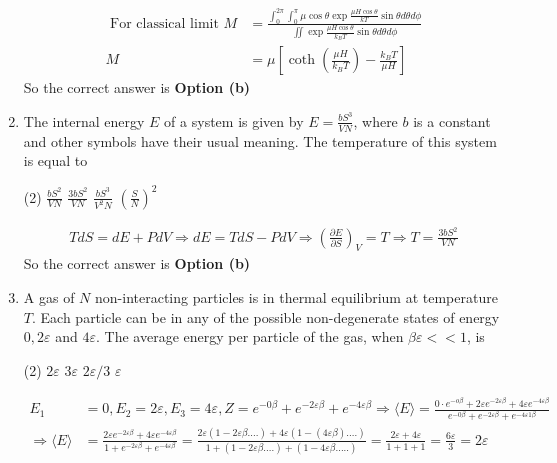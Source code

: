 \begin{enumerate}
\begin{answer}
\begin{align*}
	\text { For classical limit } M&=\frac{\int_{0}^{2 \pi} \int_{0}^{\pi} \mu \cos \theta \exp \frac{\mu H \cos \theta}{k T} \sin \theta d \theta d \phi}{\iint \exp \frac{\mu H \cos \theta}{k_{B} T} \sin \theta d \theta d \phi} \\
	M&=\mu\left[\operatorname{coth}\left(\frac{\mu H}{k_{B} T}\right)-\frac{k_{B} T}{\mu H}\right]
	\end{align*}
		So the correct answer is \textbf{Option (b)}
\end{answer}
\item 	The internal energy $E$ of a system is given by $E=\frac{b S^{3}}{V N}$, where $b$ is a constant and other symbols have their usual meaning. The temperature of this system is equal to
{	}
	 \begin{tasks}(2)
		\task[\textbf{a.}]$\frac{b S^{2}}{V N}$
		\task[\textbf{b.}]$\frac{3 b S^{2}}{V N}$
		\task[\textbf{c.}]$\frac{b S^{3}}{V^{2} N}$
		\task[\textbf{d.}] $\left(\frac{S}{N}\right)^{2}$
	\end{tasks}
\begin{answer}
	\begin{align*}
	T d S=d E+P d V \Rightarrow d E=T d S-P d V \Rightarrow\left(\frac{\partial E}{\partial S}\right)_{V}=T \Rightarrow T=\frac{3 b S^{2}}{V N}
	\end{align*}
	So the correct answer is \textbf{Option (b)}
\end{answer}
\item A gas of $N$ non-interacting particles is in thermal equilibrium at temperature $T$. Each particle can be in any of the possible non-degenerate states of energy $0,2 \varepsilon$ and $4 \varepsilon$. The average energy per particle of the gas, when $\beta \varepsilon<<1$, is
{	}
 \begin{tasks}(2)
	\task[\textbf{a.}]$2 \varepsilon$
	\task[\textbf{b.}] $3 \varepsilon$
	\task[\textbf{c.}]$2 \varepsilon / 3$
	\task[\textbf{d.}]  $\varepsilon$
\end{tasks}	
\begin{answer}
	\begin{align*}
	E_{1}&=0, E_{2}=2 \varepsilon, E_{3}=4 \varepsilon, Z=e^{-0 \beta}+e^{-2 \varepsilon \beta}+e^{-4 \varepsilon \beta} \Rightarrow\langle E\rangle=\frac{0 \cdot e^{-o \beta}+2 \varepsilon e^{-2 \varepsilon \beta}+4 \varepsilon e^{-4 \varepsilon \beta}}{e^{-0 \beta}+e^{-2 \varepsilon \beta}+e^{-4 \varepsilon 1 \beta}} \\
	\Rightarrow\langle E\rangle&=\frac{2 \varepsilon e^{-2 \varepsilon \beta}+4 \varepsilon e^{-4 \varepsilon \beta}}{1+e^{-2 \varepsilon \beta}+e^{-4 \varepsilon \beta}}=\frac{2 \varepsilon(1-2 \varepsilon \beta \ldots .)+4 \varepsilon(1-(4 \varepsilon \beta) \ldots .)}{1+(1-2 \varepsilon \beta \ldots .)+(1-4 \varepsilon \beta \ldots . .)}=\frac{2 \varepsilon+4 \varepsilon}{1+1+1}=\frac{6 \varepsilon}{3}=2 \varepsilon\\

\end{align*}
\end{answer}
\end{enumerate}
